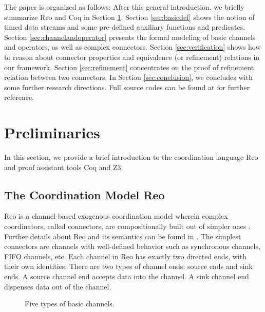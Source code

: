 \documentclass[3p,times]{elsarticle}
\begin{document}
The paper is organized as follows: After this general introduction, we briefly summarize Reo and Coq
in Section \ref{sec:pre}. Section \ref{sec:basicdef} shows the notion of timed data streams and some
pre-defined auxiliary functions and predicates. Section \ref{sec:channelandoperator} presents the
formal modeling of basic channels and operators, as well as complex connectors. Section
\ref{sec:verification} shows how to reason about connector properties and equivalence (or
refinement) relations in our framework. Section \ref{sec:refinement} concentrates on the proof of refinement relation between two connectors.
In Section \ref{sec:conclusion}, we concludes with some further research directions. Full source codes can be found at \cite{reo2coqfile} for further reference.

\section{Preliminaries}\label{sec:pre}

In this section, we provide a brief introduction to the coordination language Reo and proof assistant tools Coq and Z3.

\subsection{The Coordination Model Reo}
Reo is a channel-based exogenous coordination model wherein complex coordinators, called connectors,
are compositionally built out of simpler ones \cite{Arb04}.
Further details about Reo and its semantics can be found in \cite{Arb04,AR03,BSAR06}.
The simplest connectors are channels with well-defined behavior such as synchronous channels, FIFO channels, etc.
Each channel in Reo has exactly two directed ends, with their own identities.
There are two types of channel ends: source ends and sink ends. A source channel end accepts
data into the channel. A sink channel end dispenses data out of the channel.
\begin{figure}
  \centering
  \vspace{-6mm}
  \caption{Five types of basic channels.}\label{fig:basicchannel}
\end{figure}
\end{document}
